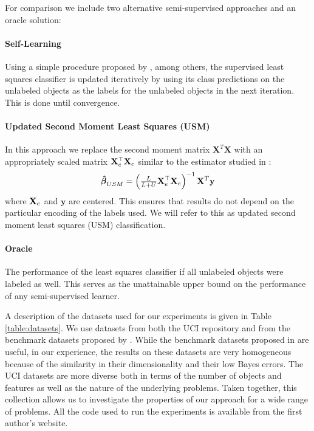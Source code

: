 \documentclass{elsarticle}
\begin{document}
For comparison we include two alternative semi-supervised approaches and an oracle solution: 
\paragraph{Self-Learning} Using a simple procedure proposed by \cite{McLachlan1975}, among others, the supervised least squares classifier is updated iteratively by using its class predictions on the unlabeled objects as the labels for the unlabeled objects in the next iteration. This is done until convergence.

\paragraph{Updated Second Moment Least Squares (USM)} In this approach we replace the second moment matrix $\mathbf{X}^T \mathbf{X}$ with an appropriately scaled matrix $\mathbf{X}_e^{\top} \mathbf{X}_e$ similar to the estimator studied in \cite{Shaffer1991}:
$$
\boldsymbol{\hat{\beta}}_{USM} = \left( \tfrac{L}{L+U} \mathbf{X}_e^{\top} \mathbf{X}_e \right)^{-1} \mathbf{X}^T \mathbf{y}
$$
where $\mathbf{X}_e$ and $\mathbf{y}$ are centered. This ensures that results do not depend on the particular encoding of the labels used. We will refer to this as updated second moment least squares (USM) classification. 

\paragraph{Oracle} The performance of the least squares classifier if all unlabeled objects were labeled as well. This serves as the unattainable upper bound on the performance of any semi-supervised learner. 


A description of the datasets used for our experiments is given in Table \ref{table:datasets}. We use datasets from both the UCI repository \cite{Bache2013} and from the benchmark datasets proposed by \cite{Chapelle2006}. While the benchmark datasets proposed in \cite{Chapelle2006} are useful, in our experience, the results on these datasets are very homogeneous because of the similarity in their dimensionality and their low Bayes errors. The UCI datasets are more diverse both in terms of the number of objects and features as well as the nature of the underlying problems. Taken together, this collection allows us to investigate the properties of our approach for a wide range of problems.
All the code used to run the experiments is available from the first author's website.
\end{document}
